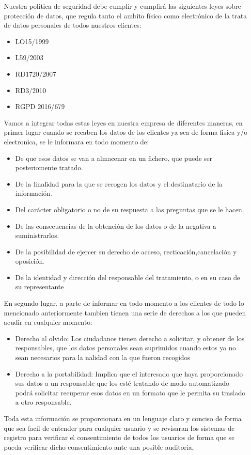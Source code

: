 \documentclass[11pt,bibtotoc,noliststotoc,BCOR0mm]{scrbook}
\begin{document}
Nuestra politica de seguridad debe cumplir y cumplirá las siguientes leyes sobre protección de datos, que regula tanto el ambito físico como electrónico de la trata de datos personales de todos nuestros clientes:
\begin{itemize}
\item LO15/1999
\item L59/2003
\item RD1720/2007
\item RD3/2010
\item RGPD 2016/679
\end{itemize}
Vamos a integrar todas estas leyes en nuestra empresa de diferentes maneras, en primer lugar cuando se recaben los datos de los clientes ya sea de forma fisica y/o electronica, se le informara en todo momento de:
\begin{itemize}
\item De que esos datos se van a almacenar en un fichero, que puede ser posteriomente tratado.
\item De la finalidad para la que se recogen los datos y el destinatario de la información.
\item Del carácter obligatorio o no de su respuesta a las preguntas que se le hacen.
\item De las consecuencias de la obtención de los datos o de la negativa a suministrarlos.
\item De la posibilidad de ejercer su derecho de acceso, recticación,cancelación y oposición.
\item De la identidad y dirección del responsable del tratamiento, o en su caso de su representante
\end{itemize}
En segundo lugar, a parte de informar en todo momento a los clientes de todo lo mencionado anteriormente tambien tienen una serie de derechos a los que pueden acudir en cualquier momento:
\begin{itemize}
\item Derecho al olvido: Los ciudadanos tienen derecho a solicitar, y obtener de los responsables, que los datos personales sean suprimidos cuando estos ya no sean necesarios para la nalidad con la que fueron recogidos
\item Derecho a la portabilidad: Implica que el interesado que haya proporcionado sus datos a un responsable que los esté tratando de modo automatizado podrá solicitar recuperar esos datos en un formato que le permita su traslado a otro responsable.
\end{itemize}
Toda esta información se proporcionara en un lenguaje claro y conciso de forma que sea facil de entender para cualquier usuario y se revisaran los sistemas de registro para verificar el consentimiento de todos los usuarios de forma que se pueda verificar dicho consentimiento ante una posible auditoria.
\end{document}
